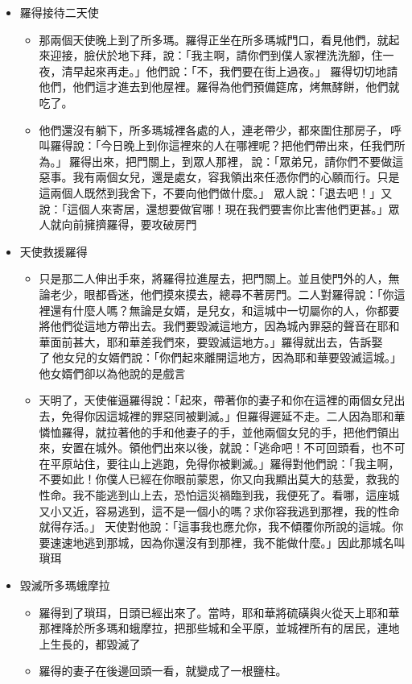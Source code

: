 \noindent 
\begin{itemize} 
\itemsep-.35em 
\item 羅得接待二天使
\begin{itemize} 
\itemsep-.35em 
\item 那兩個天使晚上到了所多瑪。羅得正坐在所多瑪城門口，看見他們，就起來迎接，臉伏於地下拜，說：「我主啊，請你們到僕人家裡洗洗腳，住一夜，清早起來再走。」他們說：「不，我們要在街上過夜。」 羅得切切地請他們，他們這才進去到他屋裡。羅得為他們預備筵席，烤無酵餅，他們就吃了。 
\item 他們還沒有躺下，所多瑪城裡各處的人，連老帶少，都來圍住那房子， 呼叫羅得說：「今日晚上到你這裡來的人在哪裡呢？把他們帶出來，任我們所為。」 羅得出來，把門關上，到眾人那裡， 說：「眾弟兄，請你們不要做這惡事。我有兩個女兒，還是處女，容我領出來任憑你們的心願而行。只是這兩個人既然到我舍下，不要向他們做什麼。」 眾人說：「退去吧！」又說：「這個人來寄居，還想要做官哪！現在我們要害你比害他們更甚。」眾人就向前擁擠羅得，要攻破房門
\end{itemize}
\item 天使救援羅得
\begin{itemize} 
\itemsep-.35em 
\item 只是那二人伸出手來，將羅得拉進屋去，把門關上。並且使門外的人，無論老少，眼都昏迷，他們摸來摸去，總尋不著房門。二人對羅得說：「你這裡還有什麼人嗎？無論是女婿，是兒女，和這城中一切屬你的人，你都要將他們從這地方帶出去。我們要毀滅這地方，因為城內罪惡的聲音在耶和華面前甚大，耶和華差我們來，要毀滅這地方。」羅得就出去，告訴娶了 他女兒的女婿們說：「你們起來離開這地方，因為耶和華要毀滅這城。」他女婿們卻以為他說的是戲言
\item 天明了，天使催逼羅得說：「起來，帶著你的妻子和你在這裡的兩個女兒出去，免得你因這城裡的罪惡同被剿滅。」但羅得遲延不走。二人因為耶和華憐恤羅得，就拉著他的手和他妻子的手，並他兩個女兒的手，把他們領出來，安置在城外。領他們出來以後，就說：「逃命吧！不可回頭看，也不可在平原站住，要往山上逃跑，免得你被剿滅。」羅得對他們說：「我主啊，不要如此！你僕人已經在你眼前蒙恩，你又向我顯出莫大的慈愛，救我的性命。我不能逃到山上去，恐怕這災禍臨到我，我便死了。看哪，這座城又小又近，容易逃到，這不是一個小的嗎？求你容我逃到那裡，我的性命就得存活。」 天使對他說：「這事我也應允你，我不傾覆你所說的這城。你要速速地逃到那城，因為你還沒有到那裡，我不能做什麼。」因此那城名叫瑣珥 
\end{itemize}
\item 毀滅所多瑪蛾摩拉
\begin{itemize} 
\itemsep-.35em 
\item 羅得到了瑣珥，日頭已經出來了。當時，耶和華將硫磺與火從天上耶和華那裡降於所多瑪和蛾摩拉，把那些城和全平原，並城裡所有的居民，連地上生長的，都毀滅了
\item 羅得的妻子在後邊回頭一看，就變成了一根鹽柱。
\end{itemize}
\end{itemize}

